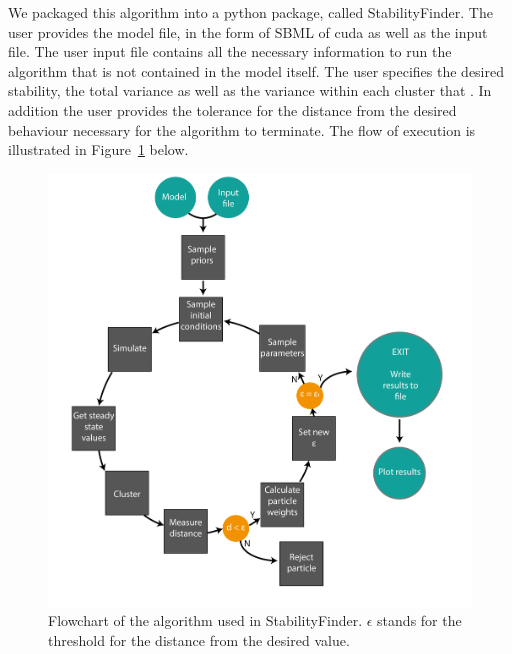 We packaged this algorithm into a python package, called StabilityFinder.  The user provides the model file, in the form of SBML of cuda as well as the input file. The user input file contains all the necessary information to run the algorithm that is not contained in the model itself. The user specifies the desired stability, the total variance as well as the variance within each cluster that . In addition the user provides the tolerance for the distance from the desired behaviour necessary for the algorithm to terminate. The flow of execution is illustrated in Figure~\ref{fig:flowchart} below.

\clearpage
\begin{figure}[htbp]
	\centering
	\includegraphics[scale=0.6]{chapterModelling/images/StabilityChecker_flowchart-01}
	\caption[Flowchart of the algorithm used in StabilityFinder]{Flowchart of the algorithm used in StabilityFinder. $\epsilon$ stands for the threshold for the distance from the desired value.}
	\label{fig:flowchart}
\end{figure}
\clearpage
 

